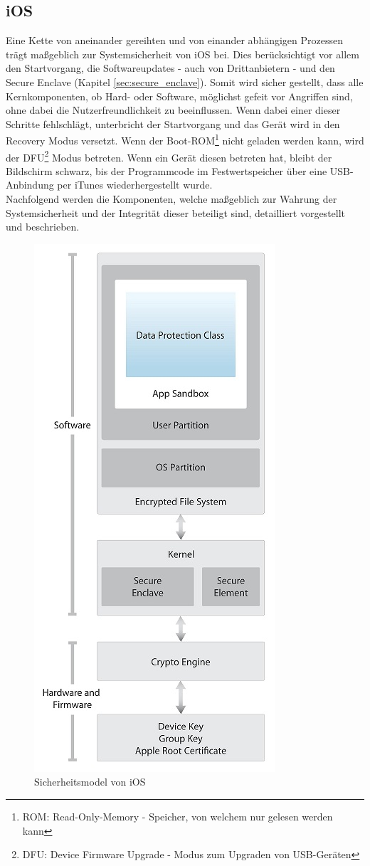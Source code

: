 \subsection{iOS}\label{sec:components-syssec} 
	Eine Kette von aneinander gereihten und von einander abhängigen Prozessen trägt
	maßgeblich zur Systemsicherheit von iOS bei. Dies berücksichtigt vor allem den
	Startvorgang, die Softwareupdates - auch von Drittanbietern - und den Secure
	Enclave (Kapitel \ref{sec:secure_enclave}). Somit wird sicher gestellt, dass
	alle Kernkomponenten, ob Hard- oder Software, möglichst gefeit vor Angriffen sind,
	ohne dabei die Nutzerfreundlichkeit zu beeinflussen. Wenn dabei einer dieser
	Schritte fehlschlägt, unterbricht der Startvorgang und das Gerät wird in den
	Recovery Modus versetzt. Wenn der Boot-ROM\footnote{ROM: Read-Only-Memory -
	Speicher, von welchem nur gelesen werden kann} nicht geladen werden kann, wird
	der DFU\footnote{DFU:
	Device Firmware Upgrade - Modus zum Upgraden von USB-Geräten} Modus betreten.
	Wenn ein Gerät diesen betreten hat, bleibt der Bildschirm schwarz, bis der
	Programmcode im Festwertspeicher über eine USB-Anbindung per iTunes
	wiederhergestellt wurde.\\
	Nachfolgend werden die Komponenten, welche maßgeblich zur Wahrung der
	Systemsicherheit und der Integrität dieser beteiligt sind, detailliert
	vorgestellt und beschrieben.
	
	\begin{figure}[h]
		\centering
		\includegraphics[width=0.4\linewidth]{ios/media/security-model.jpg}
		\caption{Sicherheitsmodel von iOS 
		\cite[S. 4]{iOSSecurityApr2015}}
		\label{fig:security-model}
	\end{figure}


